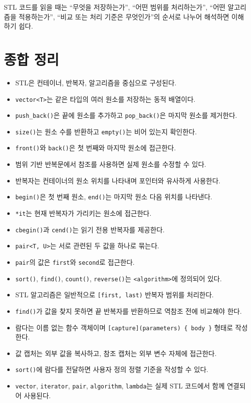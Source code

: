 \documentclass[11pt,a4paper]{article}
\begin{document}
\begin{importantbox}
STL 코드를 읽을 때는 ``무엇을 저장하는가'', ``어떤 범위를 처리하는가'', ``어떤 알고리즘을 적용하는가'', ``비교 또는 처리 기준은 무엇인가''의 순서로 나누어 해석하면 이해하기 쉽다.
\end{importantbox}

\section{종합 정리}
\begin{importantbox}
\begin{itemize}[leftmargin=1.5em]
    \item STL은 컨테이너, 반복자, 알고리즘을 중심으로 구성된다.
    \item \texttt{vector<T>}는 같은 타입의 여러 원소를 저장하는 동적 배열이다.
    \item \texttt{push\_back()}은 끝에 원소를 추가하고 \texttt{pop\_back()}은 마지막 원소를 제거한다.
    \item \texttt{size()}는 원소 수를 반환하고 \texttt{empty()}는 비어 있는지 확인한다.
    \item \texttt{front()}와 \texttt{back()}은 첫 번째와 마지막 원소에 접근한다.
    \item 범위 기반 반복문에서 참조를 사용하면 실제 원소를 수정할 수 있다.
    \item 반복자는 컨테이너의 원소 위치를 나타내며 포인터와 유사하게 사용한다.
    \item \texttt{begin()}은 첫 번째 원소, \texttt{end()}는 마지막 원소 다음 위치를 나타낸다.
    \item \texttt{*it}는 현재 반복자가 가리키는 원소에 접근한다.
    \item \texttt{cbegin()}과 \texttt{cend()}는 읽기 전용 반복자를 제공한다.
    \item \texttt{pair<T, U>}는 서로 관련된 두 값을 하나로 묶는다.
    \item \texttt{pair}의 값은 \texttt{first}와 \texttt{second}로 접근한다.
    \item \texttt{sort()}, \texttt{find()}, \texttt{count()}, \texttt{reverse()}는 \texttt{<algorithm>}에 정의되어 있다.
    \item STL 알고리즘은 일반적으로 \texttt{[first, last)} 반복자 범위를 처리한다.
    \item \texttt{find()}가 값을 찾지 못하면 끝 반복자를 반환하므로 역참조 전에 비교해야 한다.
    \item 람다는 이름 없는 함수 객체이며 \texttt{[capture](parameters) \{ body \}} 형태로 작성한다.
    \item 값 캡처는 외부 값을 복사하고, 참조 캡처는 외부 변수 자체에 접근한다.
    \item \texttt{sort()}에 람다를 전달하면 사용자 정의 정렬 기준을 작성할 수 있다.
    \item \texttt{vector}, \texttt{iterator}, \texttt{pair}, \texttt{algorithm}, \texttt{lambda}는 실제 STL 코드에서 함께 연결되어 사용된다.
\end{itemize}
\end{importantbox}
\end{document}

